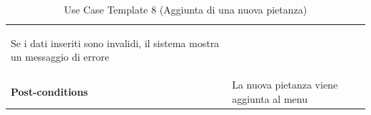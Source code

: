 \documentclass{article}
\begin{document}
\begin{table}
\begin{tabularx}{\textwidth}{|lX|}
\begin{description}[nosep,before=\leavevmode\vspace*{-1\baselineskip},after=\leavevmode\vspace*{-1\baselineskip}]
                                                                        \item [4a.] Se i dati inseriti sono invalidi, il sistema mostra un messaggio di errore
                                                                    \end{description} \\
                    \rowcolor{white} \textbf{Post-conditions} & La nuova pietanza viene aggiunta al menu \\
                    \toprule
                \end{tabularx}
                \caption{Use Case Template 8 (Aggiunta di una nuova pietanza)}
                \label{tab:use-case-template-8}
            \end{table}
\end{document}

